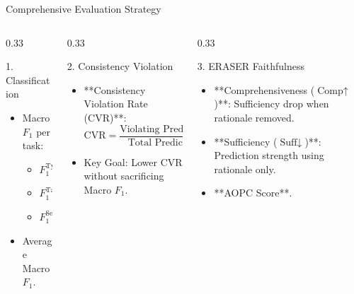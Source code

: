 \documentclass[10pt, aspectratio=169]{beamer}
\begin{document}
\begin{frame}{Comprehensive Evaluation Strategy}
    \begin{columns}
        \begin{column}{0.33\textwidth}
            \begin{block}{1. Classification}
                \begin{itemize}
                    \item Macro $F_1$ per task:
                    \begin{itemize}
                        \item $F_1^{\text{Type}}$
                        \item $F_1^{\text{Target}}$
                        \item $F_1^{\text{Severity}}$
                    \end{itemize}
                    \item Average Macro $F_1$.
                    \end{itemize}
            \end{block}
        \end{column}

        \begin{column}{0.33\textwidth}
            \begin{block}{2. Consistency Violation}
                \begin{itemize}
                    \item **Consistency Violation Rate (CVR)**:
                    $$\text{CVR} = \frac{\text{Violating Predictions}}{\text{Total Predictions}} \times 100\%$$
                    \item Key Goal: Lower CVR without sacrificing Macro $F_1$.
                \end{itemize}
            \end{block}
        \end{column}

        \begin{column}{0.33\textwidth}
            \begin{block}{3. ERASER Faithfulness}
                \begin{itemize}
                    \item **Comprehensiveness ($\text{Comp} \uparrow$)**: Sufficiency drop when rationale removed.
                    \item **Sufficiency ($\text{Suff} \downarrow$)**: Prediction strength using rationale only.
                    \item **AOPC Score**.
                \end{itemize}
            \end{block}
        \end{column}
    \end{columns}
\end{frame}
\end{document}
